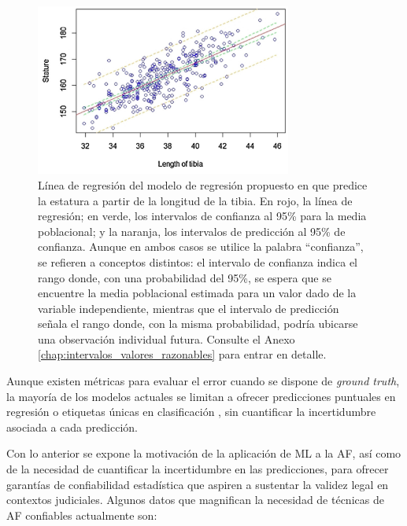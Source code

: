 \begin{figure}[h]
    \centering
    \includegraphics[width=0.75\textwidth]{capitulos/cap_01/imagenes/regression_line_lentibia_stature.png}
    \caption[
        Línea de regresión de un modelo de regresión que predice la estatura a partir de la longitud de la tibia.
    ]{
        Línea de regresión del modelo de regresión propuesto en \cite{verma2020} que predice la estatura a partir de la longitud de la tibia. En rojo, la línea de regresión; en verde, los intervalos de confianza al 95\% para la media poblacional; y la naranja, los intervalos de predicción al 95\% de confianza. Aunque en ambos casos se utilice la palabra ``confianza'', se refieren a conceptos distintos: el intervalo de confianza indica el rango donde, con una probabilidad del 95\%, se espera que se encuentre la media poblacional estimada para un valor dado de la variable independiente, mientras que el intervalo de predicción señala el rango donde, con la misma probabilidad, podría ubicarse una observación individual futura. Consulte el Anexo \ref{chap:intervalos_valores_razonables} para entrar en detalle.
    } 
    \label{fig:regression_lentibia_stature}
\end{figure}

Aunque existen métricas para evaluar el error cuando se dispone de \textit{ground truth}, la mayoría de los modelos actuales se limitan a ofrecer predicciones puntuales en regresión \cite{park2024, imaizumi2021, stepanovsky2024} o etiquetas únicas en clasificación \cite{venema2022, park2024}, sin cuantificar la incertidumbre asociada a cada predicción.

Con lo anterior se expone la motivación de la aplicación de \acrshort{ML} a la \acrshort{AF}, así como de la necesidad de cuantificar la incertidumbre en las predicciones, para ofrecer garantías de confiabilidad estadística que aspiren a sustentar la validez legal en contextos judiciales. Algunos datos que magnifican la necesidad de técnicas de \acrshort{AF} confiables actualmente son:

